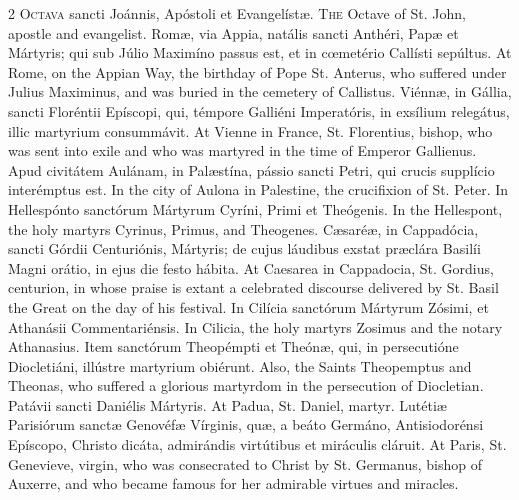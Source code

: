 \begin{paracol}{2}
\lettrine[lines=1]{O}{ctava} sancti Joánnis, Apóstoli et Evangelístæ.
\switchcolumn
{}
\lettrine[lines=1]{T}{he} Octave of St. John, apostle and evangelist.
\switchcolumn*
{}
Romæ, via Appia, natális sancti Anthéri, Papæ 
 et Mártyris; qui sub Júlio Maximíno passus est, et in cœmetério Callísti 
 sepúltus.
\switchcolumn
{}
At Rome, on the Appian Way, the birthday of Pope St. Anterus, who suffered 
 under Julius Maximinus, and was buried in the cemetery of Callistus.
\switchcolumn*
{}
Viénnæ, in Gállia, sancti Floréntii Epíscopi, 
 qui, témpore Galliéni Imperatóris, in exsílium relegátus, illic martyrium 
 consummávit.
\switchcolumn
{}
At Vienne in France, St. Florentius, bishop, who was sent into exile and who 
 was martyred in the time of Emperor Gallienus.
\switchcolumn*
{}
Apud civitátem Aulánam, in Palæstína, pássio 
 sancti Petri, qui crucis supplício interémptus est.
\switchcolumn
{}
In the city of Aulona in Palestine, the crucifixion of St. Peter.
\switchcolumn*
{}
In Hellespónto sanctórum Mártyrum Cyríni, Primi et Theógenis.
\switchcolumn
{}
In the Hellespont, the holy martyrs Cyrinus, Primus, and Theogenes.
\switchcolumn*
{}
Cæsaréæ, in Cappadócia, sancti Górdii 
 Centuriónis, Mártyris; de cujus láudibus exstat præclára Basilíi Magni 
 orátio, in ejus die festo hábita.
\switchcolumn
{}
At Caesarea in Cappadocia, St. Gordius, centurion, in whose praise is extant 
 a celebrated discourse delivered by St. Basil the Great on the day of his 
 festival.
\switchcolumn*
{}
In Cilícia sanctórum Mártyrum Zósimi, et 
 Athanásii Commentariénsis.
\switchcolumn
{}
In Cilicia, the holy martyrs Zosimus and the notary Athanasius.
\switchcolumn*
{}
Item sanctórum Theopémpti et Theónæ, qui, in 
 persecutióne Diocletiáni, illústre martyrium obiérunt.
\switchcolumn
{}
Also, the Saints Theopemptus and Theonas, who suffered a glorious martyrdom 
 in the persecution of Diocletian.
\switchcolumn*
{}
Patávii sancti Daniélis Mártyris.
\switchcolumn
{}
At Padua, St. Daniel, martyr.
\switchcolumn*
{}
Lutétiæ Parisiórum sanctæ Genovéfæ Vírginis, 
 quæ, a beáto Germáno, Antisiodorénsi Epíscopo, Christo dicáta, admirándis 
 virtútibus et miráculis cláruit.
\switchcolumn
{}
At Paris, St. Genevieve, virgin, who was consecrated to Christ by St. 
 Germanus, bishop of Auxerre, and who became famous for her admirable virtues 
 and miracles.
\switchcolumn*
{}
\end{paracol}


